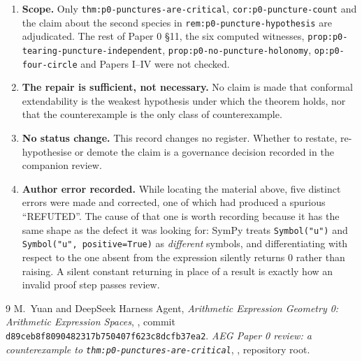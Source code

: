 \documentclass[11pt]{article}
\begin{document}
\begin{enumerate}
\item \textbf{Scope.} Only \texttt{thm:p0-punctures-are-critical},
\texttt{cor:p0-puncture-count} and the claim about the second species in
\texttt{rem:p0-puncture-hypothesis} are adjudicated. The rest of Paper 0 \S11,
the six computed witnesses, \texttt{prop:p0-tearing-puncture-independent},
\texttt{prop:p0-no-puncture-holonomy}, \texttt{op:p0-four-circle} and Papers
I--IV were not checked.
\item \textbf{The repair is sufficient, not necessary.} No claim is made that
conformal extendability is the weakest hypothesis under which the theorem holds,
nor that the counterexample is the only class of counterexample.
\item \textbf{No status change.} This record changes no register. Whether to
restate, re-hypothesise or demote the claim is a governance decision recorded in
the companion review.
\item \textbf{Author error recorded.} While locating the material above, five
distinct errors were made and corrected, one of which had produced a spurious
``REFUTED''. The cause of that one is worth recording because it has the same
shape as the defect it was looking for: SymPy treats \texttt{Symbol("u")} and
\texttt{Symbol("u", positive=True)} as \emph{different} symbols, and
differentiating with respect to the one absent from the expression silently
returns $0$ rather than raising. A silent constant returning in place of a result
is exactly how an invalid proof step passes review.
\end{enumerate}

\begin{thebibliography}{9}
M.~Yuan and DeepSeek Harness Agent,
\emph{Arithmetic Expression Geometry 0: Arithmetic Expression Spaces},
, commit \texttt{d89ceb8f8090482317b750407f623c8dcfb37ea2}.
\emph{AEG Paper 0 review: a counterexample to
\texttt{thm:p0-punctures-are-critical}},
,
repository root.
\end{thebibliography}
\end{document}
